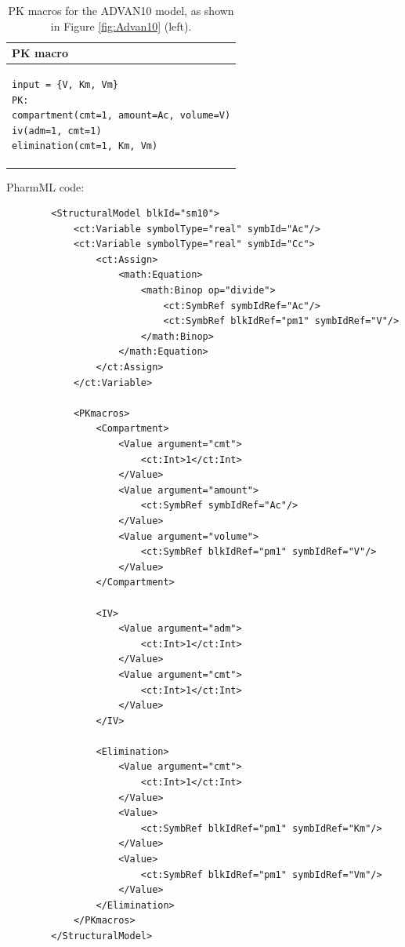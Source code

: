 \begin{table}[h!]
\setlength{\tabcolsep}{15pt}
\begin{center}
\begin{tabular}{l}
  \hline \hline
PK macro \\[-.25ex]
  \hline
\lstset{language=NONMEMdataSet}
\begin{lstlisting}
input = {V, Km, Vm}
PK:
compartment(cmt=1, amount=Ac, volume=V)
iv(adm=1, cmt=1)
elimination(cmt=1, Km, Vm)
\end{lstlisting}
\\
  \hline
\end{tabular}
\caption{PK macros for the ADVAN10 model, as shown in Figure \ref{fig:Advan10} (left).}
\label{tab:advan10Table}
\end{center}
\end{table}


PharmML code:
\lstset{language=XML}
\begin{lstlisting}
        <StructuralModel blkId="sm10">
            <ct:Variable symbolType="real" symbId="Ac"/>
            <ct:Variable symbolType="real" symbId="Cc">
                <ct:Assign>
                    <math:Equation>
                        <math:Binop op="divide">
                            <ct:SymbRef symbIdRef="Ac"/>
                            <ct:SymbRef blkIdRef="pm1" symbIdRef="V"/>
                        </math:Binop>
                    </math:Equation>
                </ct:Assign>
            </ct:Variable>
            
            <PKmacros>
                <Compartment>
                    <Value argument="cmt">
                        <ct:Int>1</ct:Int>
                    </Value>
                    <Value argument="amount">
                        <ct:SymbRef symbIdRef="Ac"/>
                    </Value>
                    <Value argument="volume">
                        <ct:SymbRef blkIdRef="pm1" symbIdRef="V"/>
                    </Value>
                </Compartment>
                
                <IV>
                    <Value argument="adm">
                        <ct:Int>1</ct:Int>
                    </Value>
                    <Value argument="cmt">
                        <ct:Int>1</ct:Int>
                    </Value>
                </IV>
                
                <Elimination>
                    <Value argument="cmt">
                        <ct:Int>1</ct:Int>
                    </Value>
                    <Value>
                        <ct:SymbRef blkIdRef="pm1" symbIdRef="Km"/>
                    </Value>
                    <Value>
                        <ct:SymbRef blkIdRef="pm1" symbIdRef="Vm"/>
                    </Value>
                </Elimination>
            </PKmacros>
        </StructuralModel>
\end{lstlisting}


